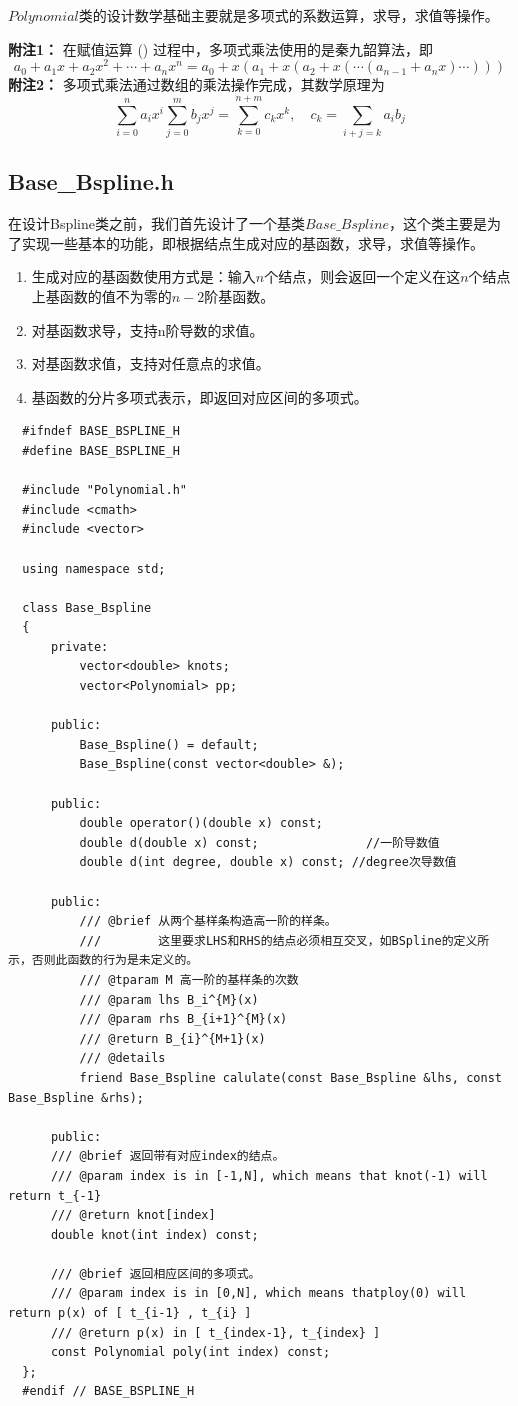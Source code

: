 \documentclass[a4paper]{article}
\begin{document}
$Polynomial$类的设计数学基础主要就是多项式的系数运算，求导，求值等操作。

\textbf{附注1：} 在赋值运算 () 过程中，多项式乘法使用的是秦九韶算法，即
$$
a_0+a_1x+a_2x^2+\cdots+a_nx^n = a_0+x(a_1+x(a_2+x(\cdots(a_{n-1}+a_nx)\cdots)))
$$
\textbf{附注2：} 多项式乘法通过数组的乘法操作完成，其数学原理为
$$
\sum\limits_{i=0}^na_ix^i \sum\limits_{j=0}^mb_jx^j = 
\sum\limits_{k=0}^{n+m}c_k x^k, \quad c_k=\sum\limits_{i+j=k}a_i b_j
$$
\subsection*{\textbf{Base\_Bspline.h}}
在设计Bspline类之前，我们首先设计了一个基类$Base\_Bspline$，这个类主要是为了实现一些基本的功能，即根据结点生成对应的基函数，求导，求值等操作。
\begin{enumerate}
  \item 生成对应的基函数使用方式是：输入$n$个结点，则会返回一个定义在这$n$个结点上基函数的值不为零的$n-2$阶基函数。
  \item 对基函数求导，支持n阶导数的求值。
  \item 对基函数求值，支持对任意点的求值。
  \item 基函数的分片多项式表示，即返回对应区间的多项式。
\end{enumerate}
\begin{lstlisting}
  #ifndef BASE_BSPLINE_H
  #define BASE_BSPLINE_H
  
  #include "Polynomial.h"
  #include <cmath>
  #include <vector>
  
  using namespace std;
  
  class Base_Bspline
  {
      private:
          vector<double> knots;
          vector<Polynomial> pp;
      
      public:
          Base_Bspline() = default;
          Base_Bspline(const vector<double> &);
  
      public:
          double operator()(double x) const;
          double d(double x) const;               //一阶导数值
          double d(int degree, double x) const; //degree次导数值
      
      public: 
          /// @brief 从两个基样条构造高一阶的样条。
          ///        这里要求LHS和RHS的结点必须相互交叉，如BSpline的定义所示，否则此函数的行为是未定义的。
          /// @tparam M 高一阶的基样条的次数
          /// @param lhs B_i^{M}(x)
          /// @param rhs B_{i+1}^{M}(x)
          /// @return B_{i}^{M+1}(x)
          /// @details 
          friend Base_Bspline calulate(const Base_Bspline &lhs, const Base_Bspline &rhs);
      
      public:
      /// @brief 返回带有对应index的结点。
      /// @param index is in [-1,N], which means that knot(-1) will return t_{-1}
      /// @return knot[index]
      double knot(int index) const;
  
      /// @brief 返回相应区间的多项式。
      /// @param index is in [0,N], which means thatploy(0) will return p(x) of [ t_{i-1} , t_{i} ]
      /// @return p(x) in [ t_{index-1}, t_{index} ]
      const Polynomial poly(int index) const;
  };
  #endif // BASE_BSPLINE_H
\end{lstlisting}
\end{document}

